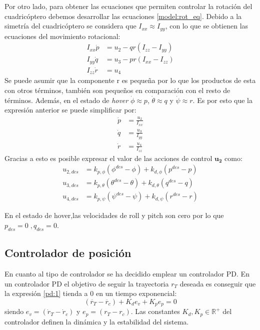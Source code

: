 Por otro lado, para obtener las ecuaciones que permiten controlar la rotación del cuadricóptero debemos desarrollar las ecuaciones \ref{model:rot_eq}. Debido a la simetría del cuadricóptero se considera que $I_{xx} \approx I_{yy}$, con lo que se obtienen las ecuaciones del movimiento rotacional:
\begin{align}
	I_ {xx} \dot p &= u_2 - qr(I_{zz}-I_{yy})\nonumber\\
	I_ {yy} \dot q &= u_3 - pr(I_{xx}-I_{zz})\label{eq:control2}\\
	I_ {zz} \dot r &= u_4\nonumber
\end{align}
Se puede asumir que la componente r es pequeña por lo que los productos de esta con otros términos, también son pequeños en comparación con el resto de términos. Además, en el estado de \textit{hover} $\dot{\phi}\approx p$, $\dot{\theta}\approx q$ y $\dot{\psi}\approx r$. Es por esto que la expresión anterior se puede simplificar por:
\begin{align}
	\dot p &= \frac{u_2}{I_ {xx}} \nonumber\\
	\dot q &= \frac{u_3}{I_ {yy}}\label{eq:control3}\\
	\dot r &= \frac{u_4}{I_ {zz}}\nonumber
\end{align}
Gracias a esto es posible expresar el valor de las acciones de control $\mathbf{u_2}$ como:
\begin{align}
	\label{eq:u2_linearized}
	u_{2,des} &= k_{p,\phi}(\phi^{des}-\phi) + k_{d,\phi}(p^{des}-p)\\
	u_{3,des} &= k_{p,\theta}(\theta^{des}-\theta) + k_{d,\theta}(q^{des}-q)\\
	u_{4,des} &= k_{p,\psi}(\psi^{des}-\psi) + k_{d,\psi}(r^{des}-r)
\end{align}

En el estado de hover,las velocidades de roll y pitch son cero por lo que $p_{des} = 0\;, q_{des} = 0$.

\subsection{Controlador de posición}


En cuanto al tipo de controlador se ha decidido emplear un controlador PD. En un controlador PD el objetivo de seguir la trayectoria $r_T$ deseada es conseguir que la expresión \ref{pd:1} tienda a 0 en un tiempo exponencial:
\begin{equation}
	\label{pd:1}
	\left(\ddot{r_T} - \ddot{r_c}\right) + K_d e_v + K_p e_p = 0
\end{equation}
siendo $e_v = (\dot r_T - \dot r_c )$ y $e_p = (r_T - r_c )$. Las constantes $K_d,K_p \in \mathbb{R^+}$ del controlador definen la dinámica y la estabilidad del sistema.

